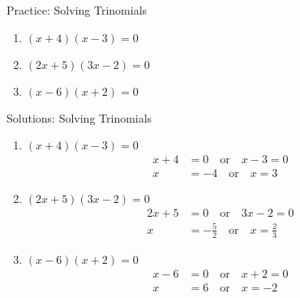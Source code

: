 \documentclass[aspectratio=169]{beamer}
\begin{document}
\begin{frame}{Practice: Solving Trinomials}
    \begin{tcolorbox}[colback=lightgray,colframe=primary,title=Solve Each of the Following]
        \footnotesize
        \begin{enumerate}
            \setlength{\itemsep}{0.5em}
            \item $(x + 4)(x - 3) = 0$
            \item $(2x + 5)(3x - 2) = 0$
            \item $(x - 6)(x + 2) = 0$
        \end{enumerate}
    \end{tcolorbox}
\end{frame}

\begin{frame}{Solutions: Solving Trinomials}
    \begin{tcolorbox}[colback=lightgray,colframe=accent,title=Detailed Solutions]
        \footnotesize
        \begin{enumerate}
            \setlength{\itemsep}{0.5em}
            \item $(x + 4)(x - 3) = 0$
            \begin{align*}
                x + 4 &= 0 \quad \text{or} \quad x - 3 = 0 \\
                x &= -4 \quad \text{or} \quad x = 3
            \end{align*}
            
            \item $(2x + 5)(3x - 2) = 0$
            \begin{align*}
                2x + 5 &= 0 \quad \text{or} \quad 3x - 2 = 0 \\
                x &= -\frac{5}{2} \quad \text{or} \quad x = \frac{2}{3}
            \end{align*}
            
            \item $(x - 6)(x + 2) = 0$
            \begin{align*}
                x - 6 &= 0 \quad \text{or} \quad x + 2 = 0 \\
                x &= 6 \quad \text{or} \quad x = -2
            \end{align*}
        \end{enumerate}
    \end{tcolorbox}
\end{frame}
\end{document}
